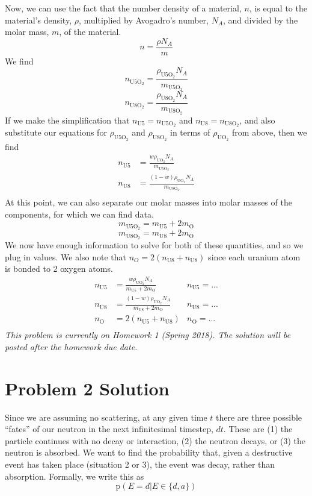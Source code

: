 \documentclass{report}
\begin{document}
Now, we can use the fact that the number density of a material, $n$, is equal to the material's density, $\rho$, multiplied by Avogadro's number, $N_A$, and divided by the molar mass, $m$, of the material. 
$$ n = \frac{\rho N_A}{m} $$
We find
$$ n_{\text{U5O}_2} = \frac{\rho_{\text{U5O}_2} N_A}{m_{\text{U5O}_2}} $$
$$ n_{\text{U8O}_2} = \frac{\rho_{\text{U8O}_2} N_A}{m_{\text{U8O}_2}} $$
If we make the simplification that $n_{\text{U5}} = n_{\text{U5O}_2}$ and $n_{\text{U8}} = n_{\text{U8O}_2}$, and also substitute our equations for $\rho_{\text{U5O}_2}$ and $\rho_{\text{U8O}_2}$ in terms of $\rho_{\text{UO}_2}$ from above, then we find 
\begin{align*}
n_{\text{U5}} &= \frac{w\rho_{\text{UO}_2} N_A}{m_{\text{U5O}_2}} \\
n_{\text{U8}} &= \frac{(1-w)\rho_{\text{UO}_2} N_A}{m_{\text{U8O}_2}} \\
\end{align*}
At this point, we can also separate our molar masses into molar masses of the components, for which we can find data. 
$$ m_{\text{U5O}_2} = m_{\text{U5}} + 2m_{\text{O}} $$
$$ m_{\text{U8O}_2} = m_{\text{U8}} + 2m_{\text{O}} $$
We now have enough information to solve for both of these quantities, and so we plug in values. We also note that $n_O = 2(n_{\text{U8}} + n_{\text{U8}})$ since each uranium atom is bonded to 2 oxygen atoms.
\begin{align*}
n_{\text{U5}}	&= \frac{w\rho_{\text{UO}_2} N_A}{m_{\text{U5}} + 2m_{\text{O}}}		& \boxed{n_{\text{U5}}= ... }\\
n_{\text{U8}}	&= \frac{(1-w)\rho_{\text{UO}_2} N_A}{m_{\text{U8}} + 2m_{\text{O}}} 	& \boxed{n_{\text{U8}}= ... }\\
n_{\text{O}}	&= 2(n_{\text{U5}} + n_{\text{U8}})  									& \boxed{n_{\text{O}}= ...  }\\
\end{align*}
\else
\textit{This problem is currently on Homework 1 (Spring 2018). The solution will be posted after the homework due date.}
\fi



\newpage


\section*{Problem 2 Solution}


Since we are assuming no scattering, at any given time $t$ there are three possible ``fates'' of our neutron in the next infinitesimal timestep, $dt$. These are (1) the particle continues with no decay or interaction, (2) the neutron decays, or (3) the neutron is absorbed. We want to find the probability that, given a destructive event has taken place (situation 2 or 3), the event was decay, rather than absorption. Formally, we write this as 
$$ \text{p}(E=d | E \in \{d,a\}) $$
\end{document}
